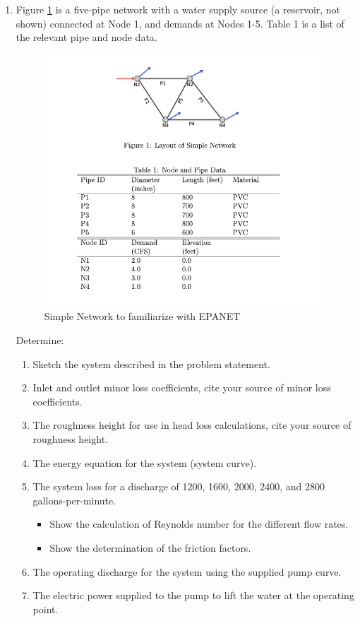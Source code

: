 \documentclass[12pt]{article}
\begin{document}
\begin{enumerate}

\item Figure  \ref{fig:SimpleNetwork}  is  a  five-pipe  network  with  a  water  supply  source  (a  reservoir,  not  shown) connected at Node 1, and demands at Nodes 1-5.  
Table 1 is a list of the relevant pipe and node data.

\begin{figure}[h!] %
\centering
   \includegraphics[width=6in]{SimpleNetwork.png}
   \caption{Simple Network to familiarize with EPANET}
   \label{fig:SimpleNetwork} 
\end{figure}
\clearpage

Determine:
\begin{enumerate}
\item Sketch the system described in the problem statement.
\item Inlet and outlet minor loss coefficients, cite your source of minor loss coefficients.
\item The roughness height for use in head loss calculations, cite your source of roughness height.
\item The energy equation for the system (system curve).
\item The system loss for a discharge of 1200, 1600, 2000, 2400, and 2800 gallons-per-minute. 
    \begin{itemize}
    \item Show the calculation of Reynolds number for the different flow rates. 
    \item Show the determination of the friction factors.
    \end{itemize}
\item The operating discharge for the system using the supplied pump curve.
\item The electric power supplied to the pump to lift the water at the operating point.
\end{enumerate}
\clearpage


\end{enumerate}
\end{document}
